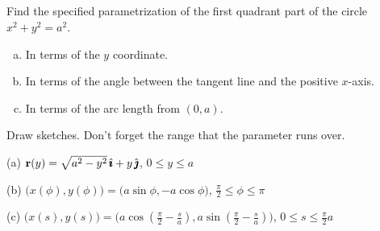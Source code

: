 



\subsection*{\Conceptual}


\begin{question}\label{prob_s1.0first}
Find the specified parametrization of the first quadrant part
of the circle $x^2+y^2=a^2$.
\begin{enumerate}[(a)]
\item 
  In terms of the $y$ coordinate.
\item
  In terms of the angle between the tangent line and the 
  positive $x$-axis.
\item
  In terms of the arc length from $(0,a)$.
\end{enumerate}
\end{question}

\begin{hint} 
Draw sketches. Don't forget the range that the parameter runs over.
\end{hint}

\begin{answer} 
(a) $\mathbf{r}(y)=\sqrt{a^2-y^2}\,\hat{\pmb{\imath}}+ y\,\hat{\pmb{\jmath}}$, $0\le y\le a$

(b) $\big(x(\phi),y(\phi)\big)
       =\big(a\sin \phi ,-a\cos \phi \big)$,
   $\frac{\pi}{2}\le\phi\le\pi$

(c) $\big(x(s),y(s)\big)
    =\big(a\cos(\tfrac{\pi}{2}-\frac{s}{a}),
           a\sin(\tfrac{\pi}{2}-\tfrac{s}{a})\big)$,
   $0\le s\le\tfrac{\pi}{2}a$
\end{answer}

